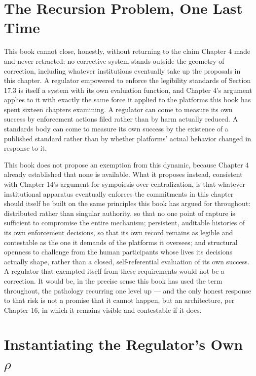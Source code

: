\documentclass[12pt,a4paper]{book}
\begin{document}
\section{The Recursion Problem, One Last Time}

This book cannot close, honestly, without returning to the claim Chapter 4 made and never retracted: no corrective system stands outside the geometry of correction, including whatever institutions eventually take up the proposals in this chapter. A regulator empowered to enforce the legibility standards of Section 17.3 is itself a system with its own evaluation function, and Chapter 4's argument applies to it with exactly the same force it applied to the platforms this book has spent sixteen chapters examining. A regulator can come to measure its own success by enforcement actions filed rather than by harm actually reduced. A standards body can come to measure its own success by the existence of a published standard rather than by whether platforms' actual behavior changed in response to it.

This book does not propose an exemption from this dynamic, because Chapter 4 already established that none is available. What it proposes instead, consistent with Chapter 14's argument for sympoiesis over centralization, is that whatever institutional apparatus eventually enforces the commitments in this chapter should itself be built on the same principles this book has argued for throughout: distributed rather than singular authority, so that no one point of capture is sufficient to compromise the entire mechanism; persistent, auditable histories of its own enforcement decisions, so that its own record remains as legible and contestable as the one it demands of the platforms it oversees; and structural openness to challenge from the human participants whose lives its decisions actually shape, rather than a closed, self-referential evaluation of its own success. A regulator that exempted itself from these requirements would not be a correction. It would be, in the precise sense this book has used the term throughout, the pathology recurring one level up — and the only honest response to that risk is not a promise that it cannot happen, but an architecture, per Chapter 16, in which it remains visible and contestable if it does.

\section{Instantiating the Regulator's Own \texorpdfstring{$\rho$}{rho}}
\end{document}
